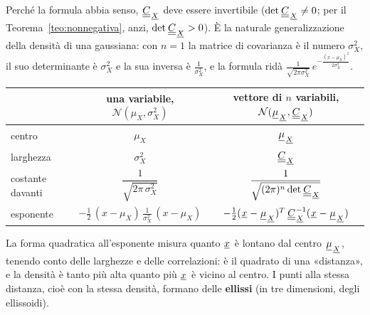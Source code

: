 
Perché la formula abbia senso, ${\mkern1mu\underline{\underline{C}}\mkern1mu}_{{\mkern1mu\underline{X}\mkern1mu}}$ deve essere invertibile ($\det {\mkern1mu\underline{\underline{C}}\mkern1mu}_{{\mkern1mu\underline{X}\mkern1mu}} \neq 0$; per il
Teorema~\ref{teo:nonnegativa}, anzi, $\det {\mkern1mu\underline{\underline{C}}\mkern1mu}_{{\mkern1mu\underline{X}\mkern1mu}} > 0$). È la naturale generalizzazione della densità di una
gaussiana: con $n = 1$ la matrice di covarianza è il numero $\sigma_X^2$, il suo determinante è $\sigma_X^2$ e la sua
inversa è $\frac{1}{\sigma_X^2}$, e la formula ridà $\frac{1}{\sqrt{2\pi\sigma_X^2}}\, e^{-\frac{(x -
\mu_X)^2}{2\sigma_X^2}}$.
\begin{center}
\renewcommand{\arraystretch}{1.6}
\begin{tabular}{@{}lcc@{}}
  \toprule
  & una variabile, $\mathcal{N}(\mu_X, \sigma_X^2)$ & vettore di $n$ variabili, $\mathcal{N}({\mkern1mu\underline{\mu}\mkern1mu}_{{\mkern1mu\underline{X}\mkern1mu}},
  {\mkern1mu\underline{\underline{C}}\mkern1mu}_{{\mkern1mu\underline{X}\mkern1mu}})$ \\ \midrule
  centro & $\mu_X$ & ${\mkern1mu\underline{\mu}\mkern1mu}_{{\mkern1mu\underline{X}\mkern1mu}}$ \\
  larghezza & $\sigma_X^2$ & ${\mkern1mu\underline{\underline{C}}\mkern1mu}_{{\mkern1mu\underline{X}\mkern1mu}}$ \\
  costante davanti & $\dfrac{1}{\sqrt{2\pi\, \sigma_X^2}}$ & $\dfrac{1}{\sqrt{(2\pi)^n \det {\mkern1mu\underline{\underline{C}}\mkern1mu}_{{\mkern1mu\underline{X}\mkern1mu}}}}$ \\
  esponente & $-\frac12\, (x - \mu_X)\, \frac{1}{\sigma_X^2}\, (x - \mu_X)$ & $-\frac12 ({\mkern1mu\underline{x}\mkern1mu} -
  {\mkern1mu\underline{\mu}\mkern1mu}_{{\mkern1mu\underline{X}\mkern1mu}})^T\, {\mkern1mu\underline{\underline{C}}\mkern1mu}_{{\mkern1mu\underline{X}\mkern1mu}}^{-1} ({\mkern1mu\underline{x}\mkern1mu} - {\mkern1mu\underline{\mu}\mkern1mu}_{{\mkern1mu\underline{X}\mkern1mu}})$ \\ \bottomrule
\end{tabular}
\end{center}
La forma quadratica all'esponente misura quanto ${\mkern1mu\underline{x}\mkern1mu}$ è lontano dal centro ${\mkern1mu\underline{\mu}\mkern1mu}_{{\mkern1mu\underline{X}\mkern1mu}}$, tenendo conto
delle larghezze e delle correlazioni: è il quadrato di una «distanza», e la densità è tanto più alta quanto più
${\mkern1mu\underline{x}\mkern1mu}$ è vicino al centro. I punti alla stessa distanza, cioè con la stessa densità, formano delle \textbf{ellissi}
(in tre dimensioni, degli ellissoidi).

